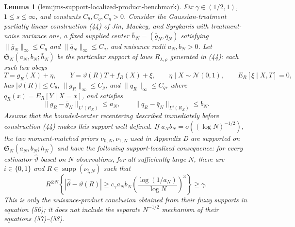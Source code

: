 \documentclass{article}
\newtheorem{lemma}{Lemma}
\begin{document}
\begin{lemma}[lem:jms-support-localized-product-benchmark]\label{lem:jms-support-localized-product-benchmark}
Fix \(\gamma\in(1/2,1)\), \(1\le s\le\infty\), and constants \(C_\theta,C_g,C_q>0\).  Consider the Gaussian-treatment partially linear construction (44) of Jin, Mackey, and Syrgkanis with treatment-noise variance one, a fixed supplied center \(\bar h_N=(\bar g_N,\bar q_N)\) satisfying \(\|\bar g_N\|_\infty\le C_g\) and \(\|\bar q_N\|_\infty\le C_q\), and nuisance radii \(a_N,b_N>0\).  Let \(\mathfrak S_N(a_N,b_N;\bar h_N)\) be the particular support of laws \(R_{\lambda,\rho}\) generated in (44): each such law obeys
\[
 T=g_R(X)+\eta,\qquad
 Y=\vartheta(R)T+f_R(X)+\xi,\qquad
 \eta\mid X\sim\mathcal N(0,1),\qquad
 E_R[\xi\mid X,T]=0,
\]
has \(|\vartheta(R)|\le C_\theta\), \(\|g_R\|_\infty\le C_g\), and \(\|q_R\|_\infty\le C_q\), where \(q_R(x)=E_R[Y\mid X=x]\), and satisfies
\[
 \|g_R-\bar g_N\|_{L^s(R_X)}\le a_N,
 \qquad
 \|q_R-\bar q_N\|_{L^s(R_X)}\le b_N.
\]
Assume that the bounded-center recentering described immediately before construction (44) makes this support well defined.  If \(a_Nb_N=o((\log N)^{-1/2})\), the two moment-matched priors \(\nu_{0,N},\nu_{1,N}\) used in Appendix D are supported on \(\mathfrak S_N(a_N,b_N;\bar h_N)\) and have the following support-localized consequence: for every estimator \(\widehat\vartheta\) based on \(N\) observations, for all sufficiently large \(N\), there are \(i\in\{0,1\}\) and \(R\in\operatorname{supp}(\nu_{i,N})\) such that
\[
 R^{\otimes N}\!\left\{
 |\widehat\vartheta-\vartheta(R)|
 \ge c_\gamma a_Nb_N
 \left(\frac{\log(1/a_N)}{\log N}\right)^3
 \right\}\ge\gamma .
\]
This is only the nuisance-product conclusion obtained from their fuzzy supports in equation (56); it does not include the separate \(N^{-1/2}\) mechanism of their equations (57)--(58).
\end{lemma}
\end{document}
